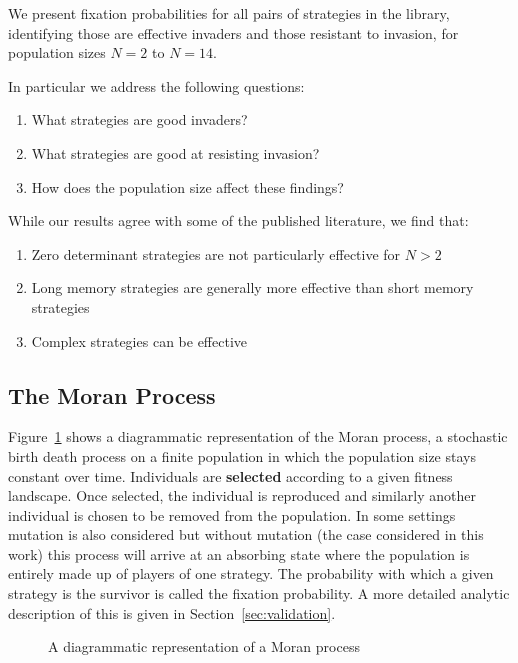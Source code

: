 \documentclass{article}
\begin{document}
We present fixation probabilities for all pairs of
strategies in the library, identifying those are effective invaders and
those resistant to invasion, for population sizes $N=2$ to $N=14$.

In particular we address the following questions:
\begin{enumerate}
    \item What strategies are good invaders?
    \item What strategies are good at resisting invasion?
    \item How does the population size affect these findings?
\end{enumerate}


While our results agree with some of the published literature, we find that:

\begin{enumerate}
 \item Zero determinant strategies are not particularly effective for $N > 2$
 \item Long memory strategies are generally more effective than short memory strategies
 \item Complex strategies can be effective
\end{enumerate}


\subsection{The Moran Process}

Figure~\ref{fig:moran_process} shows a diagrammatic representation of the Moran
process, a stochastic birth death process on a finite population
in which the population size stays constant over time. Individuals are
\textbf{selected} according to a given fitness landscape. Once selected, the
individual is reproduced and similarly another individual is chosen to be
removed from the population. In some settings mutation is also considered but
without mutation (the case considered in this work) this process will arrive at
an absorbing state where the population is entirely made up of players of
one strategy. The probability with which a given strategy is the survivor is
called the fixation probability. A more detailed analytic description of this
is given in Section~\ref{sec:validation}.

\begin{figure}[!hbtp]
    \centering
    
    \caption{A diagrammatic representation of a Moran process}
    \label{fig:moran_process}
\end{figure}
\end{document}
